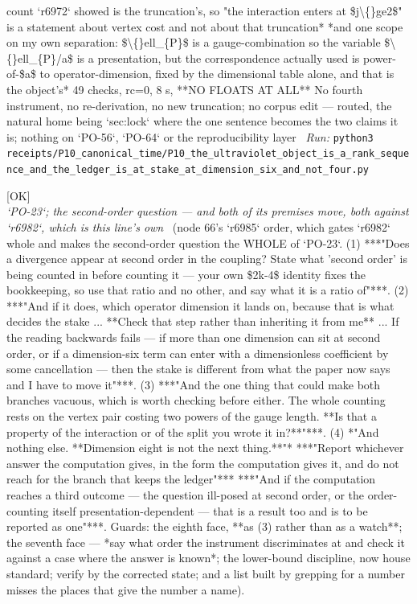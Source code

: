 \begin{description}
count `r6972` showed is the truncation's, so "the interaction enters at \$j\textbackslash\{\}ge2\$" is a statement about vertex cost and not about that truncation*  *and one scope on my own separation: \$\textbackslash\{\}ell\_\{P\}\$ is a gauge-combination so the variable \$\textbackslash\{\}ell\_\{P\}/a\$ is a presentation, but the correspondence actually used is power-of-\$a\$ to operator-dimension, fixed by the dimensional table alone, and that is the object's*  49 checks, rc=0, 8 s, **NO FLOATS AT ALL**  No fourth instrument, no re-derivation, no new truncation; no corpus edit --- routed, the natural home being `sec:lock` where the one sentence becomes the two claims it is; nothing on `PO-56`, `PO-64` or the reproducibility layer
\ \emph{Run:} \texttt{python3 receipts/P10\_canonical\_time/P10\_the\_ultraviolet\_object\_is\_a\_rank\_sequence\_and\_the\_ledger\_is\_at\_stake\_at\_dimension\_six\_and\_not\_four.py}
\item[\rcptlabel{P10_the_vertex_cost_is_the_splits_and_the_ledger_inference_is_a_non_sequitur_so_the_stake_moves}{P10R41}\textbf{P10R41}\quad\texttt{P10\_the\_vertex\_cost\_is\_the\_splits\_and\_the\_ledger\_inference\_is\_a\_non\_sequitur\_so\_the\_stake\_moves}]\hfill\textsf{[OK]}\\
\textit{`PO-23`; the second-order question --- and both of its premises move, both against `r6982`, which is this line's own} \ (node 66's `r6985` order, which gates `r6982` whole and makes the second-order question the WHOLE of `PO-23`. (1) ***"Does a divergence appear at second order in the coupling?  State what 'second order' is being counted in before counting it --- your own \$2k-4\$ identity fixes the bookkeeping, so use that ratio and no other, and say what it is a ratio of"***. (2) ***"And if it does, which operator dimension it lands on, because that is what decides the stake ... **Check that step rather than inheriting it from me** ... If the reading backwards fails --- if more than one dimension can sit at second order, or if a dimension-six term can enter with a dimensionless coefficient by some cancellation --- then the stake is different from what the paper now says and I have to move it"***. (3) ***"And the one thing that could make both branches vacuous, which is worth checking before either.  The whole counting rests on the vertex pair costing two powers of the gauge length.  **Is that a property of the interaction or of the split you wrote it in?**"***. (4) *"And nothing else.  **Dimension eight is not the next thing.**"*  ***"Report whichever answer the computation gives, in the form the computation gives it, and do not reach for the branch that keeps the ledger"***  ***"And if the computation reaches a third outcome --- the question ill-posed at second order, or the order-counting itself presentation-dependent --- that is a result too and is to be reported as one"***.  Guards: the eighth face, **as (3) rather than as a watch**; the seventh face --- *say what order the instrument discriminates at and check it against a case where the answer is known*; the lower-bound discipline, now house standard; verify by the corrected state; and a list built by grepping for a number misses the places that give the number a name). 

\end{description}
